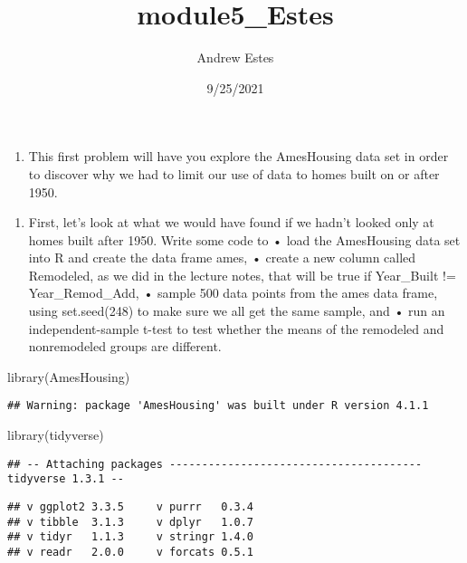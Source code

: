 \documentclass[
]{article}
\title{module5\_Estes}
\author{Andrew Estes}
\date{9/25/2021}
\newenvironment{Shaded}{\begin{snugshade}}{\end{snugshade}}
\newcommand{\FunctionTok}[1]{\textcolor[rgb]{0.00,0.00,0.00}{#1}}
\newcommand{\NormalTok}[1]{#1}
\providecommand{\tightlist}{%
  \setlength{\itemsep}{0pt}\setlength{\parskip}{0pt}}
\begin{document}
\maketitle

\begin{enumerate}
\def\labelenumi{\arabic{enumi}.}
\tightlist
\item
  This first problem will have you explore the AmesHousing data set in
  order to discover why we had to limit our use of data to homes built
  on or after 1950.
\end{enumerate}

\begin{enumerate}
\def\labelenumi{\alph{enumi}.}
\tightlist
\item
  First, let's look at what we would have found if we hadn't looked only
  at homes built after 1950. Write some code to • load the AmesHousing
  data set into R and create the data frame ames, • create a new column
  called Remodeled, as we did in the lecture notes, that will be true if
  Year\_Built != Year\_Remod\_Add, • sample 500 data points from the
  ames data frame, using set.seed(248) to make sure we all get the same
  sample, and • run an independent-sample t-test to test whether the
  means of the remodeled and nonremodeled groups are different.
\end{enumerate}

\begin{Shaded}
\begin{Highlighting}[]
\FunctionTok{library}\NormalTok{(AmesHousing)}
\end{Highlighting}
\end{Shaded}

\begin{verbatim}
## Warning: package 'AmesHousing' was built under R version 4.1.1
\end{verbatim}

\begin{Shaded}
\begin{Highlighting}[]
\FunctionTok{library}\NormalTok{(tidyverse)}
\end{Highlighting}
\end{Shaded}

\begin{verbatim}
## -- Attaching packages --------------------------------------- tidyverse 1.3.1 --
\end{verbatim}

\begin{verbatim}
## v ggplot2 3.3.5     v purrr   0.3.4
## v tibble  3.1.3     v dplyr   1.0.7
## v tidyr   1.1.3     v stringr 1.4.0
## v readr   2.0.0     v forcats 0.5.1
\end{verbatim}
\end{document}

